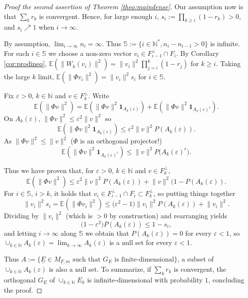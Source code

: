 \documentclass[10pt,a4paper]{article}
\newcommand{\norm}[1]{\lVert #1\rVert}
\newcommand{\kN}{k\in \mathbb{N}}
\newcommand{\iN}{i\in \mathbb{N}}
\newcommand{\expec}[1]{\mathbb{E}\left(#1\right)}
\newcommand{\ind}[1]{\mathbf{1}_{#1}}
\begin{document}
\begin{proof}[Proof the second assertion of Theorem \ref{theo:maindense}]
Our assumption now is that $\sum_k r_k$ is convergent. Hence, for large enough $i$, $s_i:=\prod_{k\geq i} (1-r_k) >0$, and $s_i \nearrow 1$ when $i\to \infty$.

By assumption, $\lim_{i\to \infty} n_i=\infty$. Thus $\mathbb{S}:=\{\iN^*, n_i-n_{i-1} >0\}$ is infinite. For each $i\in \mathbb{S}$ we choose a non-zero vector $v_i\in F_{i-1}^{\perp} \cap F_i$. By Corollary \ref{cor:prodineq}, $\expec{\norm{W_k(v_i)}^2}=\norm{v_i}^2\prod_{j=i}^{k} (1-r_j)$ for $k\geq i$. Taking the large $k$ limit, $\expec{\norm{\Phi v_i}^2}=\norm{v_i}^2s_i$ for $i\in \mathbb{S}$.

Fix $\varepsilon >0$, $\kN$ and $v\in F_k^\perp$. Write
\[ \expec{\norm{\Phi v}^2}=\expec{\norm{\Phi v}^2\ind{A_{k}(\varepsilon)}}+ \expec{\norm{\Phi v}^2\ind{A_{k}(\varepsilon)^c}}.\]
On $A_{k}(\varepsilon)$, $\norm{\Phi v}^2\leq \varepsilon^2 \norm{v}^2$ so
\[ \expec{\norm{\Phi v}^2\ind{A_{k}(\varepsilon)}}\leq \varepsilon^2 \norm{v}^2 P(A_{k}(\varepsilon)).\]
As $\norm{\Phi v}^2 \leq \norm{v}^2$ ($\Phi$ is an orthogonal projector!)
\[ \expec{\norm{\Phi v}^2\ind{A_{k}(\varepsilon)^c}}\leq \norm{v}^2P\big(A_{k}(\varepsilon)^c\big).\]

Thus we have proven that, for $\varepsilon >0$, $\kN$ and $v\in F_k^\perp$,
\[ \expec{\norm{\Phi v}^2} \leq \varepsilon^2 \norm{v}^2 P(A_{k}(\varepsilon)) +\norm{v}^2(1-P(A_{k}(\varepsilon)).\]
For $i\in \mathbb{S}$, $i>k$, it holds that $v_i\in F_{i-1}^{\perp} \cap F_i \subset F_k^\perp$, so putting things together
\[ \norm{v_i}^2s_i=\expec{\norm{\Phi v_i}^2} \leq \big(\varepsilon^2-1\big) \norm{v_i}^2 P(A_{k}(\varepsilon)) +\norm{v_i}^2.\]
Dividing by $ \norm{v_i}^2$ (which is $>0$ by construction) and rearranging yields
\[\big(1-\varepsilon^2\big)P(A_{k}(\varepsilon))\leq 1-s_i,\]
and letting $i\to \infty$ along $\mathbb{S}$ we obtain that $P(A_{k}(\varepsilon))=0$ for every $\varepsilon <1$, so $\cup_{\kN} A_{k}(\varepsilon)=\lim_{k\to \infty} A_{k}(\varepsilon)$ is a null set for every $\varepsilon <1$.

Thus $A:=\big\{\underline{E} \in M_{\underline{F},\underline{m}} \text{ such that } G_{\underline{E}}\text{ is finite-dimensional}\big\}$, a subset of $\cup_{\kN} A_{k}(\varepsilon)$ is also a null set. To summarize, if
$\sum_k r_k$ is convergent, the orthogonal $G_{\underline{E}}$ of $\cup_{\kN}E_k$ is infinite-dimensional with probability $1$, concluding the proof.
\end{proof}
\end{document}

